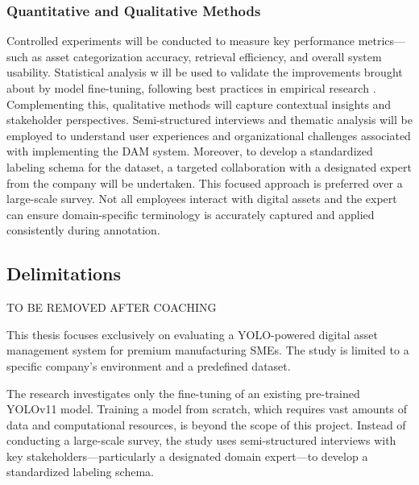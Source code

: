 \documentclass[a4paper,10pt,twocolumn]{article}
\numberwithin{figure}{section}
\numberwithin{table}{section}
\begin{document}
\subsubsection{Quantitative and Qualitative Methods }
\vspace{0.3cm}
Controlled experiments will be conducted to measure key performance 
metrics—such as asset categorization accuracy, retrieval efficiency, 
and overall system usability. Statistical analysis w
ill be used to validate the improvements brought about by model fine-tuning, 
following best practices in empirical research \citep{creswell2014, yin2014case}.
Complementing this, qualitative methods will capture contextual insights and 
stakeholder perspectives. Semi-structured interviews and thematic analysis 
will be employed to understand user experiences and organizational challenges 
associated with implementing the DAM system. 
Moreover, to develop a standardized 
labeling schema for the dataset, a targeted collaboration with a designated 
expert from the company will be undertaken. This focused approach is 
preferred over a large-scale survey. Not all employees interact 
with digital assets and the expert can ensure domain-specific 
terminology is accurately captured and applied consistently during annotation.

\subsection{Delimitations}
TO BE REMOVED AFTER COACHING

This thesis focuses exclusively on evaluating a YOLO-powered digital asset management 
system for premium manufacturing SMEs. The study is limited to a specific company’s 
environment and a predefined dataset.

The research investigates only the fine-tuning of an existing pre-trained YOLOv11 model. 
Training a model from scratch, which requires vast amounts of data and computational resources, 
is beyond the scope of this project.
Instead of conducting a large-scale survey, the study uses semi-structured interviews with key 
stakeholders—particularly a designated domain expert—to develop a standardized labeling schema. 
\end{document}
